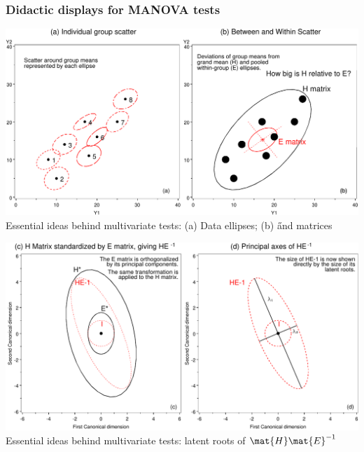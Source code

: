  \begin{frame}
	\frametitle{Didactic displays for MANOVA tests}

  \begin{center}
	\includegraphics[width=.9\textwidth,clip]{fig/arcmanov1}
	\\ Essential ideas behind multivariate tests: (a) Data ellipses; (b) \H and \E matrices
  \end{center}

  \begin{center}
	\includegraphics[width=.9\textwidth,clip]{fig/arcmanov2}
	\\ Essential ideas behind multivariate tests: latent roots of $\mat{H} \mat{E}^{-1}$
  \end{center}
  \end{frame}

